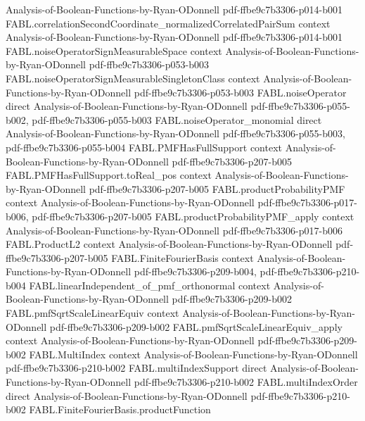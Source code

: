 \begin{theorem}
  {Analysis-of-Boolean-Functions-by-Ryan-ODonnell}
  {pdf-ffbe9c7b3306-p014-b001}
\proofstep
  {FABL.correlationSecondCoordinate_normalizedCorrelatedPairSum}
  {context}
  {Analysis-of-Boolean-Functions-by-Ryan-ODonnell}
  {pdf-ffbe9c7b3306-p014-b001}
\proofstep
  {FABL.noiseOperatorSignMeasurableSpace}
  {context}
  {Analysis-of-Boolean-Functions-by-Ryan-ODonnell}
  {pdf-ffbe9c7b3306-p053-b003}
\proofstep
  {FABL.noiseOperatorSignMeasurableSingletonClass}
  {context}
  {Analysis-of-Boolean-Functions-by-Ryan-ODonnell}
  {pdf-ffbe9c7b3306-p053-b003}
\proofstep
  {FABL.noiseOperator}
  {direct}
  {Analysis-of-Boolean-Functions-by-Ryan-ODonnell}
  {pdf-ffbe9c7b3306-p055-b002,
    pdf-ffbe9c7b3306-p055-b003}
\proofstep
  {FABL.noiseOperator_monomial}
  {direct}
  {Analysis-of-Boolean-Functions-by-Ryan-ODonnell}
  {pdf-ffbe9c7b3306-p055-b003,
    pdf-ffbe9c7b3306-p055-b004}
\proofstep
  {FABL.PMFHasFullSupport}
  {context}
  {Analysis-of-Boolean-Functions-by-Ryan-ODonnell}
  {pdf-ffbe9c7b3306-p207-b005}
\proofstep
  {FABL.PMFHasFullSupport.toReal_pos}
  {context}
  {Analysis-of-Boolean-Functions-by-Ryan-ODonnell}
  {pdf-ffbe9c7b3306-p207-b005}
\proofstep
  {FABL.productProbabilityPMF}
  {context}
  {Analysis-of-Boolean-Functions-by-Ryan-ODonnell}
  {pdf-ffbe9c7b3306-p017-b006,
    pdf-ffbe9c7b3306-p207-b005}
\proofstep
  {FABL.productProbabilityPMF_apply}
  {context}
  {Analysis-of-Boolean-Functions-by-Ryan-ODonnell}
  {pdf-ffbe9c7b3306-p017-b006}
\proofstep
  {FABL.ProductL2}
  {context}
  {Analysis-of-Boolean-Functions-by-Ryan-ODonnell}
  {pdf-ffbe9c7b3306-p207-b005}
\proofstep
  {FABL.FiniteFourierBasis}
  {context}
  {Analysis-of-Boolean-Functions-by-Ryan-ODonnell}
  {pdf-ffbe9c7b3306-p209-b004,
    pdf-ffbe9c7b3306-p210-b004}
\proofstep
  {FABL.linearIndependent_of_pmf_orthonormal}
  {context}
  {Analysis-of-Boolean-Functions-by-Ryan-ODonnell}
  {pdf-ffbe9c7b3306-p209-b002}
\proofstep
  {FABL.pmfSqrtScaleLinearEquiv}
  {context}
  {Analysis-of-Boolean-Functions-by-Ryan-ODonnell}
  {pdf-ffbe9c7b3306-p209-b002}
\proofstep
  {FABL.pmfSqrtScaleLinearEquiv_apply}
  {context}
  {Analysis-of-Boolean-Functions-by-Ryan-ODonnell}
  {pdf-ffbe9c7b3306-p209-b002}
\proofstep
  {FABL.MultiIndex}
  {context}
  {Analysis-of-Boolean-Functions-by-Ryan-ODonnell}
  {pdf-ffbe9c7b3306-p210-b002}
\proofstep
  {FABL.multiIndexSupport}
  {direct}
  {Analysis-of-Boolean-Functions-by-Ryan-ODonnell}
  {pdf-ffbe9c7b3306-p210-b002}
\proofstep
  {FABL.multiIndexOrder}
  {direct}
  {Analysis-of-Boolean-Functions-by-Ryan-ODonnell}
  {pdf-ffbe9c7b3306-p210-b002}
\proofstep
  {FABL.FiniteFourierBasis.productFunction}

\end{theorem}
